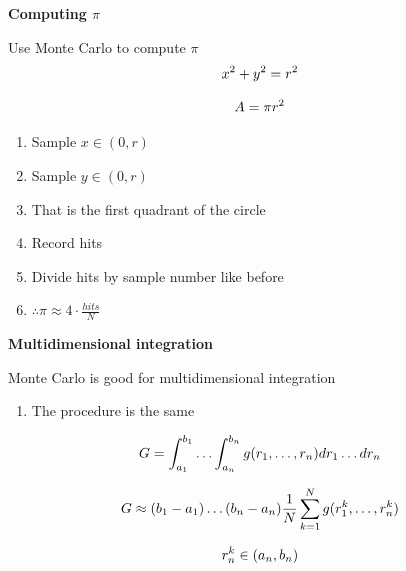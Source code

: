 \documentclass[aspectratio=1610,pdftex,dvipsnames,compress,xcolor={dvipsnames}]{beamer}
\begin{document}
\begin{frame}[plain]{}
    \centering\LARGE\textbf{Computing $\pi$}
\end{frame}


\addtocounter{framenumber}{-1} 
\begin{frame}{Use Monte Carlo to compute $\pi$}
    \begin{equation}
        \LARGE
        x^2 + y^2 = r^2
    \end{equation}

    \begin{equation}
        \LARGE
        A = \pi r^2
    \end{equation}

    \vspace*{\fill}

    \begin{enumerate}[series=outerlist,topsep=0pt,itemsep=11pt,leftmargin=*,label=(\arabic*)]
        \item[]Sample $x \in (0,r)$
        \item[]Sample $y \in (0,r)$
        \item[]That is the first quadrant of the circle
        \item[]Record hits
        \item[]Divide hits by sample number like before
        \item[]\Large $\therefore \pi \approx 4 \cdot \frac{hits}{N}$
    \end{enumerate}
\end{frame}


\begin{frame}[plain]{}
    \centering\LARGE\textbf{Multidimensional integration}
\end{frame}


\addtocounter{framenumber}{-1} 
\begin{frame}{Monte Carlo is good for multidimensional integration}
    \begin{enumerate}[series=outerlist,topsep=0pt,itemsep=21pt,leftmargin=*,label=(\arabic*)]
        \item[]The procedure is the same
    \end{enumerate}

    \vspace*{\fill}

    \begin{equation}
        \LARGE
        G = \int_{a_1}^{b_1} \ldots \int_{a_n}^{b_n} g(r_1, \ldots ,r_n) dr_1 \ldots dr_n
    \end{equation}

    \begin{equation}
        \LARGE
        G \approx (b_1-a_1) \ldots (b_n-a_n) \frac{1}{N} \sum_{k=1}^N g(r_1^k, \ldots ,r_n^k)
    \end{equation}

    \begin{equation}
        \LARGE
        r_n^k \in (a_n,b_n)
    \end{equation}
\end{frame}
\end{document}
